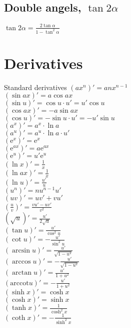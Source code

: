 \documentclass[a4paper, 10pt]{scrartcl}
\newcommand*\euler{\mathrm{e}}
\newcommand*\arccot{\mathrm{arccot}}
\begin{document}
\subsection*{Double angels, $\tan{2\alpha}$}
$\tan{2\alpha} = \frac{2\tan{\alpha}}{1 - \tan^{2}{\alpha}}$\\

\section*{Derivatives}

Standard derivatives
$(ax^{n})' = anx^{n-1}$\\
$(\sin{ax})' = a\cos{ax}$\\
$(\sin{u})' = \cos{u}\cdot u' = u'\cos{u}$\\
$(\cos{ax})' = -a\sin{ax}$\\
$(\cos{u})' = -\sin{u}\cdot u' = -u'\sin{u}$\\
$(a^{x})' = a^{x}\cdot\ln{a}$\\
$(a^{u})' = a^{u}\cdot\ln{a}\cdot u'$\\
$(\euler^{x})' = \euler^{x}$\\
$(\euler^{ax})' = a\euler^{ax}$\\
$(\euler^{u})' = u'\euler^{u}$\\
$(\ln{x})' = \frac{1}{x}$\\
$(\ln{ax})' = \frac{1}{x}$\\
$(\ln{u})' = \frac{u'}{u}$\\
$(u^{n})' = nu^{n-1}u'$\\
$(uv)' = uv' + vu'$\\
$\left(\frac{u}{v}\right)' = \frac{vu' - uv'}{v^{2}}$\\
$\left(\sqrt{u}\right)' = \frac{u'}{2\sqrt{u}}$\\
$(\tan{u})' = \frac{u'}{\cos^{2}{u}}$\\
$(\cot{u})' = -\frac{u'}{\sin^{2}{u}}$\\
$(\arcsin{u})' = \frac{u'}{\sqrt{1 - u^{2}}}$\\
$(\arccos{u})' = -\frac{u'}{\sqrt{1 - u^{2}}}$\\
$(\arctan{u})' = \frac{u'}{1 + u^{2}}$\\
$(\arccot{u})' = -\frac{u'}{1 + u^{2}}$\\
$(\sinh{x})' = \cosh{x}$\\
$(\cosh{x})' = \sinh{x}$\\
$(\tanh{x})' = \frac{1}{\cosh^{2}{x}}$\\
$(\coth{x})' = -\frac{1}{\sinh^{2}{x}}$\\
\end{document}
